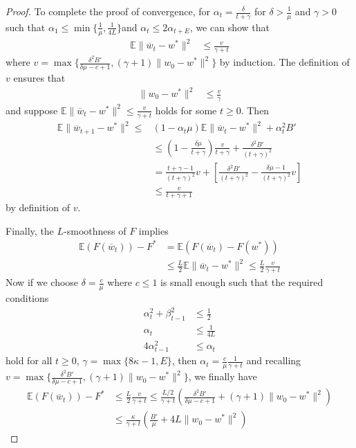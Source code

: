 \begin{proof}
	To complete the proof of convergence, for $\alpha_{t}=\frac{\delta}{t+\gamma}$
	for $\delta>\frac{1}{\mu}$ and $\gamma>0$ such that $\alpha_{1}\leq\min\{\frac{1}{\mu},\frac{1}{4L}\}$and
	$\alpha_{t}\leq2\alpha_{t+E}$, we can show that 
	\begin{align*}
	\mathbb{E}\|\overline{w}_{t}-w^{\ast}\|^{2} & \leq\frac{v}{\gamma+t}
	\end{align*}
	where $v=\max\{\frac{\delta^{2}B'}{\delta\mu-c+1},(\gamma+1)\|w_{0}-w^{\ast}\|^{2}\}$
	by induction. The definition of $v$ ensures that 
	\begin{align*}
	\|w_{0}-w^{\ast}\|^{2} & \leq\frac{v}{\gamma}
	\end{align*}
	and suppose $\mathbb{E}\|\overline{w}_{t}-w^{\ast}\|^{2}\leq\frac{v}{\gamma+t}$
	holds for some $t\geq0$. Then 
	\begin{align*}
	\mathbb{E}\|\overline{w}_{t+1}-w^{\ast}\|^{2}\leq & (1-\alpha_{t}\mu)\mathbb{E}\|\overline{w}_{t}-w^{\ast}\|^{2}+\alpha_{t}^{2}B'\\
	& \leq(1-\frac{\delta\mu}{t+\gamma})\frac{v}{t+\gamma}+\frac{\delta^{2}B'}{(t+\gamma)^{2}}\\
	& =\frac{t+\gamma-1}{(t+\gamma)^{2}}v+\left[\frac{\delta^{2}B'}{(t+\gamma)^{2}}-\frac{\delta\mu-1}{(t+\gamma)^{2}}v\right]\\
	& \leq\frac{v}{t+\gamma+1}
	\end{align*}
	by definition of $v$.
	
	Finally, the $L$-smoothness of $F$ implies 
	\begin{align*}
	\mathbb{E}(F(\overline{w}_{t}))-F^{\ast} & =\mathbb{E}(F(\overline{w}_{t})-F(w^{\ast}))\\
	& \leq\frac{L}{2}\mathbb{E}\|\overline{w}_{t}-w^{\ast}\|^{2}\leq\frac{L}{2}\frac{v}{\gamma+t}
	\end{align*}
	Now if we choose $\delta=\frac{c}{\mu}$ where $c\leq1$ is small
	enough such that the required conditions 
	\begin{align*}
	\alpha_{t}^{2}+\beta_{t-1}^{2} & \leq\frac{1}{2}\\
	\alpha_{t} & \leq\frac{1}{4L}\\
	4\alpha_{t-1}^{2} & \leq\alpha_{t}
	\end{align*}
	hold for all $t\geq0$, $\gamma=\max\{8\kappa-1,E\}$, then $\alpha_{t}=\frac{c}{\mu}\frac{1}{\gamma+t}$
	and recalling $v=\max\{\frac{\delta^{2}B'}{\delta\mu-c+1},(\gamma+1)\|w_{0}-w^{\ast}\|^{2}\}$,
	we finally have 
	\begin{align*}
	\mathbb{E}(F(\overline{w}_{t}))-F^{\ast} & \leq\frac{L}{2}\frac{v}{\gamma+t}\leq\frac{L/2}{\gamma+t}(\frac{\delta^{2}B'}{\delta\mu-c+1}+(\gamma+1)\|w_{0}-w^{\ast}\|^{2})\\
	& \leq\frac{\kappa}{\gamma+t}(\frac{B'}{\mu}+4L\|w_{0}-w^{\ast}\|^{2})
	\end{align*}
\end{proof}

